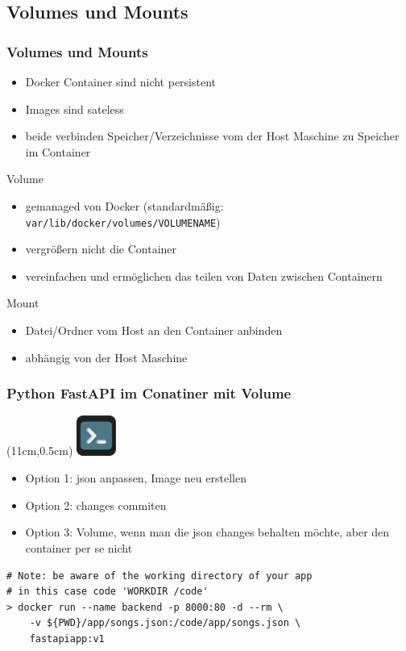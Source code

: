 \documentclass[22pt]{beamer}
\newcommand{\code}[1]{\colorbox{gray!15}{\texttt{#1}}}
\newcommand{\terminal}{
    \begin{textblock*}{1.3cm}(11cm,0.5cm) %
    \includegraphics[width=1.3cm]{Bilder/terminal2.png}
    \end{textblock*}
}
\begin{document}
\subsection{Volumes und Mounts}
\begin{frame}[t]
    \frametitle{Volumes und Mounts}
    \begin{itemize}
        \item Docker Container sind nicht persistent
					\item Images sind sateless
        \item beide verbinden Speicher/Verzeichnisse vom der Host Maschine zu Speicher im Container
    \end{itemize} \pause
    \begin{block}{Volume}
        \begin{itemize}
            \item gemanaged von Docker (standardmäßig: \code{var/lib/docker/volumes/VOLUMENAME})
            \item vergrößern nicht die Container
            \item vereinfachen und ermöglichen das teilen von Daten zwischen Containern
        \end{itemize}
    \end{block} \pause
    \begin{block}{Mount}
        \begin{itemize}
            \item Datei/Ordner vom Host an den Container anbinden
            \item abhängig von der Host Maschine
        \end{itemize}
    \end{block}
\end{frame}

\begin{frame}[fragile]
    \frametitle{Python FastAPI im Conatiner mit Volume}
    \terminal
    \begin{itemize}
        \item Option 1: json anpassen, Image neu erstellen
        \item Option 2: changes commiten
        \item Option 3: Volume, wenn man die json changes behalten möchte, aber den container per se nicht
    \end{itemize}
\vspace{0.8cm}
\begin{verbatim}
# Note: be aware of the working directory of your app
# in this case code 'WORKDIR /code'
> docker run --name backend -p 8000:80 -d --rm \
    -v ${PWD}/app/songs.json:/code/app/songs.json \
    fastapiapp:v1
\end{verbatim}
            
\end{frame}
\end{document}
